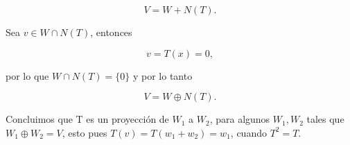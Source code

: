 \documentclass[letterpaper]{article}
\theoremstyle{definition}
\theoremstyle{lemathm}
\theoremstyle{lemademthm}
\begin{document}
\begin{enumerate}
        \[V = W + N(T).\]

        Sea $v \in W \cap N(T)$, entonces

        \[v = T(x) = 0,\]

        por lo que $W \cap N(T) = \{0\}$ y por lo tanto

        \[V = W \oplus N(T).\]

        Concluimos que T es un proyección de $W_1$ a $W_2$, para algunos $W_1, W_2$ tales que $W_1 \oplus W_2 = V$, esto pues $T(v) = T(w_1 + w_2) = w_1$, cuando $T^2 = T$.

    \end{enumerate}
\end{document}

